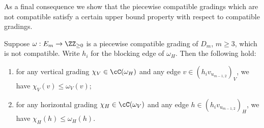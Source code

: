 As a final consequence we show that the piecewise compatible gradings which are not compatible satisfy a certain upper bound property with respect to compatible gradings.
\begin{corollary}
 \label{cor:maximality}
 Suppose $\omega:E_m\to\ZZ_{\ge0}$ is a piecewise compatible grading of $D_m$, $m\ge3$, which is not compatible.
 Write $h_i$ for the blocking edge of $\omega_H$.
 Then the following hold:
 \begin{enumerate}[label=(\alph*)]
 \item\label{coro3.24_1} for any vertical grading $\chi_V\in\cC(\omega_H)$ and any edge $v\in(h_iv_{u_{m-1,2}})_V$, we have $\chi_V(v)\le\omega_V(v)$;
 \item\label{coro3.24_2} for any horizontal grading $\chi_H\in\cC(\omega_V)$ and any edge $h\in(h_iv_{u_{m-1,2}})_H$, we have $\chi_H(h)\le\omega_H(h)$.
 \end{enumerate}
\end{corollary}
